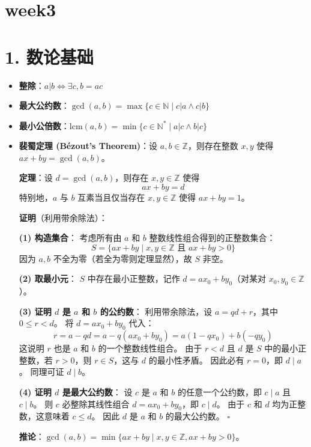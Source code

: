 \documentclass[12pt, a4paper]{article}
\begin{document}
\section*{week3}

\section*{1. 数论基础}

\begin{itemize}
    \item \textbf{整除}：\(a|b \iff \exists c, b=ac\)
    \item \textbf{最大公约数}：\(\gcd(a,b) = \max\{c \in \mathbb{N} \mid c|a \land c|b\}\)
    \item \textbf{最小公倍数}：\(\text{lcm}(a,b) = \min\{c \in \mathbb{N}^* \mid a|c \land b|c\}\)
    \item \textbf{裴蜀定理 (Bézout's Theorem)}：设 \(a, b \in \mathbb{Z}\)，则存在整数 \(x, y\) 使得 \(ax + by = \gcd(a,b)\)。

\begin{mdframed}
\textbf{定理}：设 \(d = \gcd(a,b)\)，则存在 \(x, y \in \mathbb{Z}\) 使得
\[
ax + by = d
\]
特别地，\(a\) 与 \(b\) 互素当且仅当存在 \(x, y \in \mathbb{Z}\) 使得 \(ax + by = 1\)。

\textbf{证明}（利用带余除法）：

\textbf{(1) 构造集合}：
考虑所有由 \(a\) 和 \(b\) 整数线性组合得到的正整数集合：
\[
S = \{ ax + by \mid x, y \in \mathbb{Z} \text{ 且 } ax + by > 0 \}
\]
因为 \(a, b\) 不全为零（若全为零则定理显然），故 \(S\) 非空。

\textbf{(2) 取最小元}：
\(S\) 中存在最小正整数，记作 \(d = ax_0 + by_0\)（对某对 \(x_0, y_0 \in \mathbb{Z}\)）。

\textbf{(3) 证明 \(d\) 是 \(a\) 和 \(b\) 的公约数}：
利用带余除法，设 \(a = qd + r\)，其中 \(0 \leq r < d\)。
将 \(d = ax_0 + by_0\) 代入：
\[
r = a - qd = a - q(ax_0 + by_0) = a(1 - qx_0) + b(-qy_0)
\]
这说明 \(r\) 也是 \(a\) 和 \(b\) 的一个整数线性组合。
由于 \(r < d\) 且 \(d\) 是 \(S\) 中的最小正整数，若 \(r > 0\)，则 \(r \in S\)，这与 \(d\) 的最小性矛盾。
因此必有 \(r = 0\)，即 \(d \mid a\)。
同理可证 \(d \mid b\)。

\textbf{(4) 证明 \(d\) 是最大公约数}：
设 \(c\) 是 \(a\) 和 \(b\) 的任意一个公约数，即 \(c \mid a\) 且 \(c \mid b\)。
则 \(c\) 必整除其线性组合 \(d = ax_0 + by_0\)，即 \(c \mid d\)。
由于 \(c\) 和 \(d\) 均为正整数，这意味着 \(c \leq d\)。
因此 \(d\) 是 \(a\) 和 \(b\) 的最大公约数。 \hfill \(\square\)

\textbf{推论}：\(\gcd(a,b) = \min\{ax+by \mid x, y \in \mathbb{Z}, ax+by > 0\}\)。
\end{mdframed}
\end{itemize}
\end{document}
